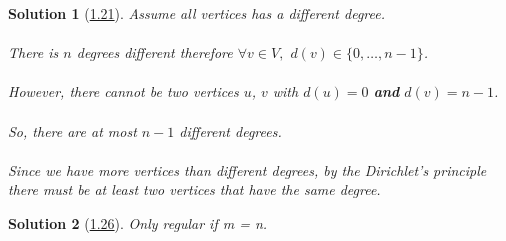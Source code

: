 \documentclass[10pt]{report}
\numberwithin{dummy}{section}
\theoremstyle{ocrenumbox}
\newtheorem{definitionTT}{Solution}[]
\theoremstyle{grayman}
\newenvironment{sol}{\begin{sBox}\begin{definitionTT}}{\end{definitionTT}\end{sBox}}
\begin{document}
\begin{sol}[\hypertarget{so121}{\hyperlink{exo121}{1.21}}]
Assume all vertices has a different degree.\\ \\
There is $n$ degrees different therefore $\forall v \in V,$ $ d(v) \in \{0,\dots,n-1\}$.\\ \\
However, there cannot be two vertices $u$, $v$ with $d(u) = 0$ \textbf{and} $d(v) = n - 1$. \\ \\
So, there are at most $n - 1$ different degrees. \\ \\
Since we have more vertices than different
degrees, by the Dirichlet's principle there must be at least two vertices that have the same degree.
\end{sol}
\begin{sol}[\hypertarget{so126}{\hyperlink{exo126}{1.26}}]
Only regular if m = n.
\end{sol}
\end{document}
